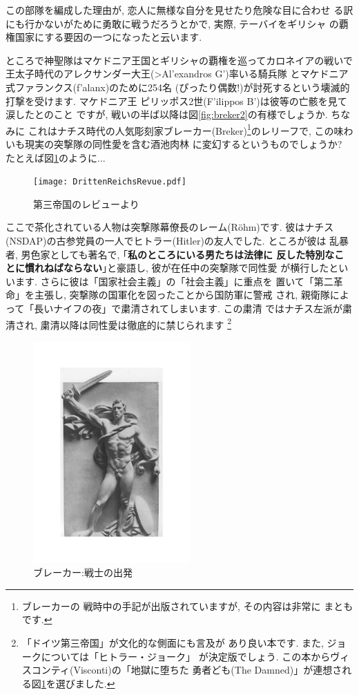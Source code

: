 \documentclass[b5j,8pt,twocolumn]{ltjsarticle}
\newcommand{\textgreek}[1]{\begingroup\fontencoding{LGR}\selectfont#1\endgroup}
\begin{document}
この部隊を編成した理由が, 恋人に無様な自分を見せたり危険な目に合わせ
る訳にも行かないがために勇敢に戦うだろうとかで, 実際, テーバイをギリシャ
の覇権国家にする要因の一つになったと云います.
\newline

ところで神聖隊はマケドニア王国とギリシャの覇権を巡ってカロネイアの戦いで
王太子時代のアレクサンダー大王(\textgreek{>Al'exandros G'})率いる騎兵隊
とマケドニア式ファランクス(\textgreek{f'alanx})のために254名
(ぴったり偶数!)が討死するという壊滅的打撃を受けます. マケドニア王
ピリッポス2世(\textgreek{F'ilippos B'})は彼等の亡骸を見て涙したとのこと
ですが, 戦いの半ば以降は図\ref{fig:breker2}の有様でしょうか. ちなみに
これはナチス時代の人気彫刻家ブレーカー(Breker)\footnote{ブレーカーの
戦時中の手記\cite{ブレーカー}が出版されていますが, その内容は非常に
まともです.}のレリーフで, この味わいも現実の突撃隊の同性愛を含む酒池肉林
に変幻するというものでしょうか? たとえば図\ref{fig:rrevue}のように...

\begin{figure}[htbp]
\begin{center}
\texttt{[image: DrittenReichsRevue.pdf]}
\caption{第三帝国のレビューより\cite{関}}
\label{fig:rrevue}
\end{center}
\end{figure}

ここで茶化されている人物は突撃隊幕僚長のレーム(R\"ohm)です. 彼はナチス
(NSDAP)の古参党員の一人でヒトラー(Hitler)の友人でした. ところが彼は
乱暴者, 男色家としても著名で, ｢\textbf{私のところにいる男たちは法律に
反した特別なことに慣れねばならない}｣と豪語し, 彼が在任中の突撃隊で同性愛
が横行したといいます. さらに彼は「国家社会主義」の「社会主義」に重点を
置いて「第二革命」を主張し, 突撃隊の国軍化を図ったことから国防軍に警戒
され, 親衛隊によって「長いナイフの夜」で粛清されてしまいます. この粛清
ではナチス左派が粛清され, 粛清以降は同性愛は徹底的に禁じられます
\footnote{「ドイツ第三帝国」\cite{クラーザー}が文化的な側面にも言及が
あり良い本です. また, ジョークについては「ヒトラー・ジョーク」\cite{関}
が決定版でしょう. この本からヴィスコンティ(Visconti)の「地獄に堕ちた
勇者ども(The Damned)」が連想される図\ref{fig:rrevue}を選びました.}
\newpage

\begin{figure}
\includegraphics[width=6cm]{Breker2_relief.pdf}
\caption{ブレーカー:戦士の出発}
\label{fig:breker1}
\end{figure}
\end{document}
